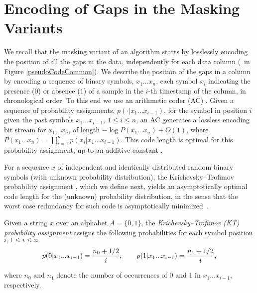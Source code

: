
\section{Encoding of Gaps in the Masking Variants}
\label{algo:maskmodes}


\newcommand{\xOneN}{x_1...x_n}
\newcommand{\StringSeq}{x_1...x_{i-1}}
\newcommand{\xiiminus}{p(x_i|\StringSeq)}
\newcommand{\xiiminustwo}{p(\cdot|\StringSeq)}
\vspace{-5pt}
We recall that the masking variant of an algorithm starts by losslessly encoding the position of all the gaps in the data, independently for each data column (\Line \gapLine\ in Figure \ref{pseudoCodeCommon}). We describe the position of the gaps in a column by encoding a sequence of binary symbols, $\xOneN$, each symbol $x_i$ indicating the presence ($0$) or absence ($1$) of a sample in the $i$-th timestamp of the column, in chronological order. To this end we use an arithmetic coder (AC) \cite{ac2, Cover2005}. Given a sequence of probability assignments, $\xiiminustwo$, for the symbol in position $i$ given the past symbols $x_1...x_{i-1}$, $1\leq i \leq n$, an AC generates a lossless encoding bit stream for $\xOneN$, of length $-\log P(\xOneN) + O(1)$, where $P(\xOneN)=\prod_{i=1}^{n}\xiiminus$. This code length is optimal for this probability assignment, up to an additive constant \cite{arcoding}.


\clearpage


For a sequence $x$ of independent and identically distributed random binary symbols (with unknown probability distribution), the Krichevsky–Trofimov probability assignment \cite{ktestimator}, which we define next, yields an asymptotically optimal code length for the (unknown) probability distribution, in the sense that the worst case redundancy for such code is asymptotically minimized~\cite{unicodinginfo}.


\begin{defcion}
\label{def:ktestimator}
Given a string $x$ over an alphabet $A = \{0, 1\}$, the \textit{Krichevsky–Trofimov (KT) probability assignment} assigns the following probabilities for each symbol position $i, 1\leq i \leq n$
\vspace{-2pt}
\begin{equation}
\label{eq:ktestimator}
p(0|\StringSeq) = \frac{n_0 + 1/2}{i}, \hspace{+20pt} p(1|\StringSeq) = \frac{n_1 + 1/2}{i},
\end{equation}
\end{defcion}
\vspace{-8pt}
where $n_0$ and $n_1$ denote the number of occurrences of 0 and 1 in $\StringSeq$, respectively.


